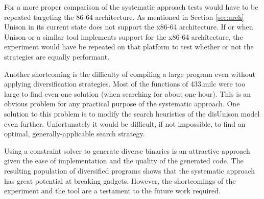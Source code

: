 For a more proper comparison of the systematic approach tests would have to be repeated
targeting the 86-64 architecture. As mentioned in Section \ref{sec:arch} Unison in its
current state does not support the x86-64 architecture. If or when Unison or a similar
tool implements support for the x86-64 architecture, the experiment would have be repeated
on that platform to test whether or not the strategies are equally performant.

Another shortcoming is the difficulty of compiling a large program even without applying
diversification strategies. Most of the functions of 433.milc were too large to find even
one solution (when searching for about one hour). This is an obvious problem for any
practical purpose of the systematic approach. One solution to this problem is to modify
the search heuristics of the disUnison model even further. Unfortunately it would be
difficult, if not impossible, to find an optimal, generally-applicable search strategy.

Using a constraint solver to generate diverse binaries is an attractive approach given
the ease of implementation and the quality of the generated code. The resulting population
of diversified programs shows that the systematic approach has great potential at breaking
gadgets. However, the shortcomings of the experiment and the tool are a testament to the
future work required.
